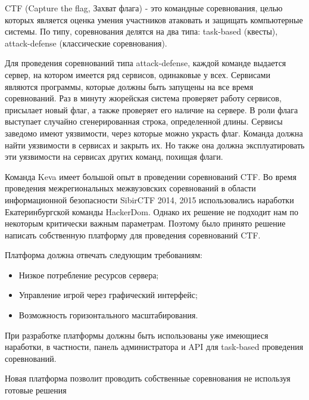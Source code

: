 CTF (Capture the flag, Захват флага) - это командные соревнования, целью которых является оценка умения участников атаковать и защищать компьютерные системы. По типу, соревнования делятся на два типа: task-based (квесты), attack-defense (классические соревнования).

Для проведения соревнований типа attack-defense, каждой команде выдается сервер, на котором имеется ряд сервисов, одинаковые у всех. Сервисами являются программы, которые должны быть запущены на все время соревнований. Раз в минуту жюрейская система проверяет работу сервисов, присылает новый флаг, а также проверяет его наличие на сервере. В роли флага выступает случайно сгенерированная строка, определенной длины. Сервисы заведомо имеют уязвимости, через которые можно украсть флаг. Команда должна найти уязвимости в сервисах и закрыть их. Но также она должна эксплуатировать эти уязвимости на сервисах других команд, похищая флаги. 

Команда Keva имеет большой опыт в проведении соревнований CTF. Во время проведения межрегиональных межвузовских соревнований в области информационной безопасности SibirCTF 2014, 2015 использовались наработки Екатеринбургской команды HackerDom. Однако их решение не подходит нам по некоторым критически важным параметрам. Поэтому  было принято решение написать собственную платформу для проведения соревнований CTF.

Платформа должна отвечать следующим требованиям:
\begin{itemize}
\item Низкое потребление ресурсов сервера;
\item Управление игрой через графический интерфейс;
\item Возможность горизонтального масштабирования.
\end{itemize}

При разработке платформы должны быть использованы уже имеющиеся наработки, в частности, панель администратора и API для task-based проведения соревнований. 

Новая платформа позволит проводить собственные соревнования не используя готовые решения 
